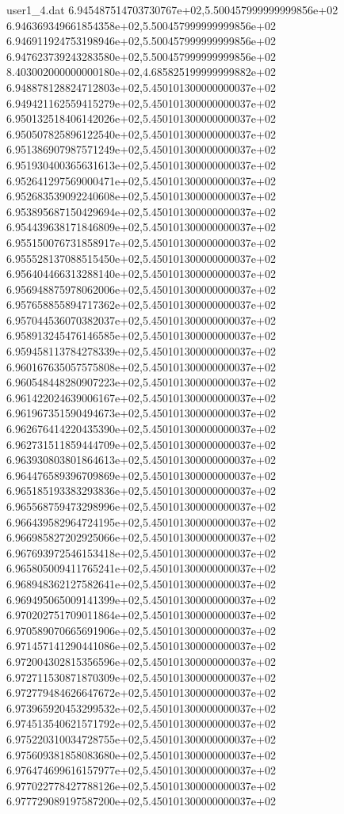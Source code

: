 \begin{filecontents}{user1_4.dat}
6.945487514703730767e+02,5.500457999999999856e+02
6.946369349661854358e+02,5.500457999999999856e+02
6.946911924753198946e+02,5.500457999999999856e+02
6.947623739243283580e+02,5.500457999999999856e+02
8.403002000000000180e+02,4.685825199999999882e+02
6.948878128824712803e+02,5.450101300000000037e+02
6.949421162559415279e+02,5.450101300000000037e+02
6.950132518406142026e+02,5.450101300000000037e+02
6.950507825896122540e+02,5.450101300000000037e+02
6.951386907987571249e+02,5.450101300000000037e+02
6.951930400365631613e+02,5.450101300000000037e+02
6.952641297569000471e+02,5.450101300000000037e+02
6.952683539092240608e+02,5.450101300000000037e+02
6.953895687150429694e+02,5.450101300000000037e+02
6.954439638171846809e+02,5.450101300000000037e+02
6.955150076731858917e+02,5.450101300000000037e+02
6.955528137088515450e+02,5.450101300000000037e+02
6.956404466313288140e+02,5.450101300000000037e+02
6.956948875978062006e+02,5.450101300000000037e+02
6.957658855894717362e+02,5.450101300000000037e+02
6.957044536070382037e+02,5.450101300000000037e+02
6.958913245476146585e+02,5.450101300000000037e+02
6.959458113784278339e+02,5.450101300000000037e+02
6.960167635057575808e+02,5.450101300000000037e+02
6.960548448280907223e+02,5.450101300000000037e+02
6.961422024639006167e+02,5.450101300000000037e+02
6.961967351590494673e+02,5.450101300000000037e+02
6.962676414220435390e+02,5.450101300000000037e+02
6.962731511859444709e+02,5.450101300000000037e+02
6.963930803801864613e+02,5.450101300000000037e+02
6.964476589396709869e+02,5.450101300000000037e+02
6.965185193383293836e+02,5.450101300000000037e+02
6.965568759473298996e+02,5.450101300000000037e+02
6.966439582964724195e+02,5.450101300000000037e+02
6.966985827202925066e+02,5.450101300000000037e+02
6.967693972546153418e+02,5.450101300000000037e+02
6.965805009411765241e+02,5.450101300000000037e+02
6.968948362127582641e+02,5.450101300000000037e+02
6.969495065009141399e+02,5.450101300000000037e+02
6.970202751709011864e+02,5.450101300000000037e+02
6.970589070665691906e+02,5.450101300000000037e+02
6.971457141290441086e+02,5.450101300000000037e+02
6.972004302815356596e+02,5.450101300000000037e+02
6.972711530871870309e+02,5.450101300000000037e+02
6.972779484626647672e+02,5.450101300000000037e+02
6.973965920453299532e+02,5.450101300000000037e+02
6.974513540621571792e+02,5.450101300000000037e+02
6.975220310034728755e+02,5.450101300000000037e+02
6.975609381858083680e+02,5.450101300000000037e+02
6.976474699616157977e+02,5.450101300000000037e+02
6.977022778427788126e+02,5.450101300000000037e+02
6.977729089197587200e+02,5.450101300000000037e+02

\end{filecontents}

